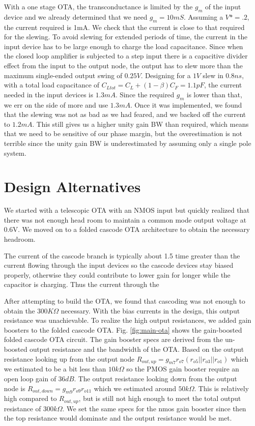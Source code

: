 \documentclass[conference]{IEEEtran}
\begin{document}
With a one stage OTA, the transconductance is limited by the $g_m$ of the input device and we already determined that we need $g_m = 10mS$. Assuming a $V* = .2$, the current required is 1mA. We check that the current is close to that required for the slewing. To avoid slewing for extended periods of time, the current in the input device has to be large enough to charge the load capacitance. Since when the closed loop amplifier is subjected to a step input there is a capacitive divider effect from the input to the output node, the output has to slew more than the maximum single-ended output swing of $0.25V$. Designing for a $1V$ slew in $0.8ns$, with a total load capacitance of $C_{Ltot} = C_L + (1-\beta)C_F = 1.1pF$, the current needed in the input devices is $1.3mA$. Since the required $g_m$ is lower than that, we err on the side of more and use  $1.3mA$. Once it was implemented, we found that the slewing was not as bad as we had feared, and we backed off the current to $1.2mA$. This still gives us a higher unity gain BW than required, which means that we need to be sensitive of our phase margin, but the overestimation is not terrible since the unity gain BW is underestimated by assuming only a single pole system.\\

\section{Design Alternatives}

We started with a telescopic OTA with an NMOS input but quickly realized that there was not enough head room to maintain a common mode output voltage at 0.6V. We moved on to a folded cascode OTA architecture to obtain the necessary headroom. 

The current of the cascode branch is typically about 1.5 time greater than the current flowing through the input devices so the cascode devices stay biased properly, otherwise they could contribute to lower gain for longer while the capacitor is charging. Thus the current through the 

After attempting to build the OTA, we found that cascoding was not enough to obtain the $300K\Omega$ necessary. With the bias currents in the design, this output resistance was unachievable. To realize the high output resistances, we added gain boosters to the folded cascode OTA. Fig. \ref{fig:main-ota} shows the gain-boosted folded cascode OTA circuit. The gain booster specs are derived from the un-boosted output resistance and the bandwidth of the OTA. Based on the output resistance looking up from the output node $R_{out, up} = g_{m7}r_{o7}(r_{o5}||r_{o3}||r_{o1})$ which we estimated to be a bit less than $10k\Omega$ so the PMOS gain booster require an open loop gain of $36dB$. The output resistance looking down from the output node is $R_{out, down} = g_{m9}r_{o9}r_{o11}$ which we estimated around $50k\Omega$. This is relatively high compared to $R_{out, up}$, but is still not high enough to meet the total output resistance of $300k\Omega$. We set the same specs for the nmos gain booster since then the top resistance would dominate and the output resistance would be met.
\end{document}
